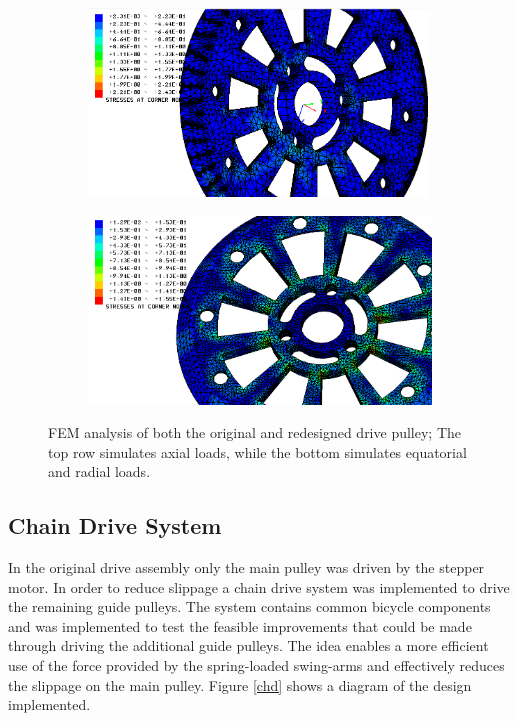\documentclass[paper=a4, fontsize=11pt]{scrartcl}
\numberwithin{equation}{section}		%
\numberwithin{figure}{section}			%
\numberwithin{table}{section}				%
\begin{document}
\begin{figure}[H]
         \begin{subfigure}[h]{0.8\textwidth}
                \includegraphics[height=5cm]{rotationnew1}
                \caption{}
				\label{femc}
        \end{subfigure}%
       \quad
        \begin{subfigure}[h]{0.8\textwidth}
                \includegraphics[height=5cm]{rotationoriginal1}
                \caption{}
                \label{femd}
        \end{subfigure}
        \quad

        \caption{FEM analysis of both the original and redesigned drive pulley; The top row simulates axial loads, while the bottom simulates equatorial and radial loads.}
        \label{fem1}
\end{figure}

\subsection{Chain Drive System}
In the original drive assembly only the main pulley was driven by the stepper motor. In order to reduce slippage a chain drive system was implemented to drive the remaining guide pulleys. The system contains common bicycle components and was implemented to test the feasible improvements that could be made through driving the additional guide pulleys. The idea enables a more efficient use of the force provided by the spring-loaded swing-arms and effectively reduces the slippage on the main pulley. Figure \ref{chd} shows a diagram of the design implemented. 
\end{document}
